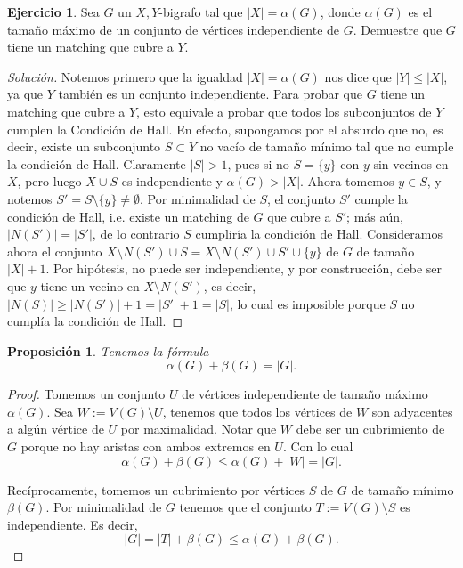 \documentclass[12pt]{report}
\theoremstyle{plain}
\newtheorem{proposition}[theorem]{Proposición}
\theoremstyle{definition}
\newtheorem{exercise}[theorem]{Ejercicio}
\newenvironment{solution}{\begin{proof}[Solución]}{\end{proof}}
\newcommand{\abs}[1]{\left \vert #1 \right \vert}
\begin{document}
\begin{exercise}
Sea $G$ un $X,Y$-bigrafo tal que $\abs X = \alpha (G)$, donde $\alpha (G)$ es el tamaño máximo de un conjunto de vértices independiente de $G$. Demuestre que $G$ tiene un matching que cubre a $Y$.
\end{exercise}
\begin{solution}
Notemos primero que la igualdad $\abs X = \alpha (G)$ nos dice que $\abs Y \leq \abs X$, ya que $Y$ también es un conjunto independiente. Para probar que $G$ tiene un matching que cubre a $Y$, esto equivale a probar que todos los subconjuntos de $Y$ cumplen la Condición de Hall. En efecto, supongamos por el absurdo que no, es decir, existe un subconjunto $S \subset Y$ no vacío de tamaño mínimo tal que no cumple la condición de Hall. Claramente $\abs S > 1$, pues si no $S = \{y\}$ con  $y$ sin vecinos en $X$, pero luego $X \cup S$ es independiente y $\alpha (G) > \abs X$. Ahora tomemos $y \in S$, y notemos $S' = S \setminus \{y \} \neq \emptyset$. Por minimalidad de $S$, el conjunto $S'$ cumple la condición de Hall, i.e. existe un matching de $G$ que cubre a $S'$; más aún, $\abs {N(S')} = \abs {S'} $, de lo contrario $S$ cumpliría la condición de Hall. Consideramos ahora el conjunto $X \setminus N(S') \cup S = X \setminus N(S') \cup S' \cup \{y\}$ de $G$ de tamaño $\abs X +1$. Por hipótesis, no puede ser independiente, y por construcción, debe ser que $y$ tiene un vecino en $X \setminus N(S')$, es decir, $\abs {N (S)} \geq \abs{N(S')} + 1 = \abs {S'} + 1 = \abs S$, lo cual es imposible porque $S$ no cumplía la condición de Hall.
\end{solution}








\begin{proposition}
Tenemos la fórmula
\[
\boxed{\alpha (G) + \beta (G) = \abs G.}
\]
\end{proposition}
\begin{proof}
Tomemos un conjunto $U$ de vértices independiente de tamaño máximo $\alpha (G)$. Sea $W := V(G) \setminus U$, tenemos que todos los vértices de $W$ son adyacentes a algún vértice de $U$ por maximalidad. Notar que $W$ debe ser un cubrimiento de $G$ porque no hay aristas con ambos extremos en $U$. Con lo cual
\[
\alpha (G) + \beta (G) \leq \alpha (G) + \abs W = \abs G.
\]

Recíprocamente, tomemos un cubrimiento por vértices $S$ de $G$ de tamaño mínimo $\beta (G)$. Por minimalidad de $G$ tenemos que el conjunto $T := V(G) \setminus S$ es independiente. Es decir,
\[
\abs G = \abs T + \beta (G) \leq \alpha (G) + \beta (G).
\]
\end{proof}
\end{document}
